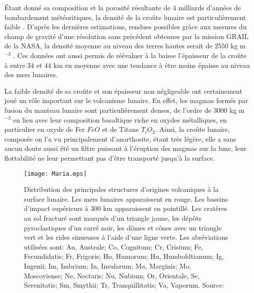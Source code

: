 Étant donné sa composition et  la porosité résultante de $4$ milliards
d'années  de  bombardement  météoritiques,  la densité  de  la  croûte
lunaire  est particulièrement  faible \citep{Huang:2012gf,Han:2014ic}.
D'après les dernières estimations, rendues possibles grâce aux mesures
du champ  de gravité d'une  résolution sans précédent obtenues  par la
mission GRAIL  de la  NASA, la  densité moyenne  au niveau  des terres
hautes serait  de $2550$  kg m$^{-3}$  \citep{Wieczorek:2013ipa}.  Ces
données ont  aussi permis de réévaluer  à la baisse l'épaisseur  de la
croûte à  entre $34$ et  $44$ km en moyenne  avec une tendance  à être
moins épaisse au niveau des mers lunaires.

La faible  densité de sa croûte  et son épaisseur non  négligeable ont
certainement joué  un rôle  important sur  le volcanisme  lunaire.  En
effet,  les  magmas   formés  par  fusion  du   manteau  lunaire  sont
particulièrement   denses,   de   l'ordre  de   $3000$   kg   m$^{-3}$
\citep{Kiefer:2012kp} en  lien avec leur composition  basaltique riche
en oxydes  métalliques, en  particulier en  oxyde de  Fer $FeO$  et de
Titane  $T_iO_2$.   Ainsi,  la  croûte lunaire,  composée  on  l'a  vu
principalement  d'anorthosite, étant  très légère,  elle a  sans aucun
doute aussi  été un  filtre puissant  à l'éruption  des magmas  sur la
lune,  leur  flottabilité ne  leur  permettant  pas d'être  transporté
jusqu'à la surface.
\begin{figure}[h!]
  \begin{center}
    \graphicspath{ {/Users/thorey/Documents/These/Manuscript/Figure/Chapter1/} }
    \texttt{[image: Maria.eps]}
    \caption{Distribution   des   principales  structures   d'origines
      volcaniques   à  la   surface   lunaire.    Les  mers   lunaires
      apparaissent en  rouge. Les bassins d'impact  supérieurs à $300$
      km apparaissent en pointillé.  Les cratères au sol fracturé sont
      marqués  d'un triangle  jaune,  les  dépôts pyroclastiques  d'un
      carré noir,  les dômes  et cônes  avec un  triangle vert  et les
      rides sinueuses  à l'aide  d'une ligne verte.   Les abréviations
      utilisées  sont: Au,  Australe; Co,  Cognitum; Cr,  Crisium; Fe,
      Fecundidatis; Fr, Frigoris; Ho,  Humorum; Hu, Humboldtianum; Ig,
      Ingenii;  Im,   Imbrium;  In,   Insularum;  Ma,   Marginis;  Mo,
      Moscoviense;  Ne,  Nectaris;  Nu,  Nubium;  Or,  Orientale,  Se,
      Serenitatis;  Sm,  Smythii;  Tr, Tranquillitatis;  Va,  Vaporum.
      Source: \citet{Platz:2015ex}}
    \label{Maria}
  \end{center}
\end{figure}

